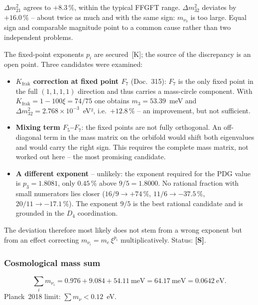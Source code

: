 \begin{tcolorbox}[colback=yellow!5!white, colframe=yellow!60!black,
  title={Open point: atmospheric mass-squared difference}]
$\Delta m_{21}^2$ agrees to $+8.3\,\%$, within the typical FFGFT range.
$\Delta m_{32}^2$ deviates by $+16.0\,\%$ -- about twice as much and with the
same sign: $m_{\nu_3}$ is too large. Equal sign and comparable magnitude
point to a common cause rather than two independent problems.

The fixed-point exponents $p_i$ are secured~[K]; the source of the
discrepancy is an open point. Three candidates were examined:
\begin{itemize}
  \item \textbf{$K_{\mathrm{frak}}$ correction at fixed point $F_7$}
    (Doc.~315): $F_7$ is the only fixed point in the full $(1,1,1,1)$
    direction and thus carries a mass-circle component. With
    $K_{\mathrm{frak}} = 1-100\xi = 74/75$ one obtains $m_3 = 53.39$~meV
    and $\Delta m_{32}^2 = 2.768\times10^{-3}$~eV², i.e.\ $+12.8\,\%$ --
    an improvement, but not sufficient.
  \item \textbf{Mixing term $F_5$--$F_7$}: the fixed points are not fully
    orthogonal. An off-diagonal term in the mass matrix on the orbifold
    would shift both eigenvalues and would carry the right sign. This
    requires the complete mass matrix, not worked out here -- the most
    promising candidate.
  \item \textbf{A different exponent} -- unlikely: the exponent required
    for the PDG value is $p_3 = 1.8081$, only $0.45\,\%$ above
    $9/5 = 1.8000$. No rational fraction with small numerators lies closer
    ($16/9 \to +74\,\%$, $11/6 \to -37.5\,\%$, $20/11 \to -17.1\,\%$).
    The exponent $9/5$ is the best rational candidate and is grounded in
    the $D_4$ coordination.
\end{itemize}
The deviation therefore most likely does not stem from a wrong exponent
but from an effect correcting $m_{\nu_i} = m_e\,\xi^{p_i}$
multiplicatively. Status: \textbf{[S]}.
\end{tcolorbox}

\subsubsection{Cosmological mass sum}

\begin{equation}
  \sum_i m_{\nu_i} = 0.976 + 9.084 + 54.11~\text{meV}
  = 64.17~\text{meV} = 0.0642~\text{eV}.
\end{equation}
Planck~2018 limit: $\sum m_\nu < 0.12$~eV. \checkmark

